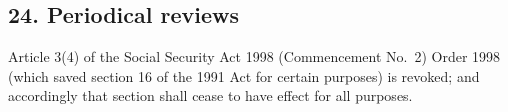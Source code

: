 \documentclass[12pt,a4paper]{article}
\begin{document}
%
%
%
%
%
%


\subsection{24. Periodical reviews}

Article 3(4)  of the  Social Security Act 1998 (Commencement No.\ 2) Order 1998 (which saved section 16 of the 1991 Act for certain purposes) is revoked; and accordingly that section shall cease to have effect for all purposes.
\end{document}
